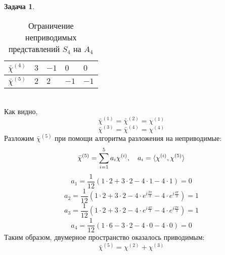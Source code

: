 \documentclass[12pt]{article}
\theoremstyle{definition}
\newtheorem{zad}{Задача}[section]
\begin{document}
\begin{zad}
\begin{table}[h!]
\begin{tabular}{|l|l|l|l|l|}
$\bar{\chi}^{(4)}$ & $3$ & $-1$ & $0$ & $0$ \\ \hline
$\bar{\chi}^{(5)}$ & $2$ & $2$ & $-1$ & $-1$ \\ \hline
\end{tabular}
\caption{Ограничение неприводимых представлений $S_4$ на $A_4$}
\end{table}\\
Как видно,
\begin{equation}
    \boxed{\bar{\chi}^{(1)}=\bar{\chi}^{(2)}=\chi^{(1)}}
\end{equation}
\begin{equation}
    \boxed{\bar{\chi}^{(3)}=\bar{\chi}^{(4)}=\chi^{(4)}}
\end{equation}
Разложим $\bar{\chi}^{(5)}$ при помощи алгоритма разложения на неприводимые:
\begin{equation}
    \bar{\chi}^{(5)}=\sum\limits_{i=1}^5 a_i\chi^{(i)},\quad a_i=\braket{\chi^{(i)},\chi^{(5)}}
\end{equation}
\begin{equation}
    a_1=\frac{1}{12}(1\cdot2+3\cdot2-4\cdot1-4\cdot1)=0
\end{equation}
\begin{equation}
    a_2=\frac{1}{12}(1\cdot2+3\cdot2-4\cdot e^{i\frac{2\pi}{3}}-4\cdot e^{i\frac{4\pi}{3}})=1
\end{equation}
\begin{equation}
    a_3=\frac{1}{12}(1\cdot2+3\cdot2-4\cdot e^{i\frac{4\pi}{3}}-4\cdot e^{i\frac{2\pi}{3}})=1
\end{equation}
\begin{equation}
    a_4=\frac{1}{12}(1\cdot6-3\cdot2-4\cdot0-4\cdot0)=0
\end{equation}
Таким образом, двумерное пространство оказалось приводимым:
\begin{equation}
    \boxed{\bar{\chi}^{(5)}=\chi^{(2)}+\chi^{(3)}}
\end{equation}
\end{zad}
\end{document}
